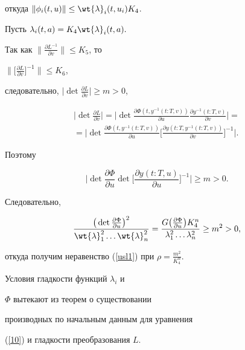 \begin{pf}
откуда $\|\phi_{i}(t,u)\|\leq \wt{\lambda}_{i}(t,u_{i})K_{4}$.


Пусть $\lambda_{i}(t,a)=K_{4}\wt{\lambda}_{i}(t,a).$


Так как $\big\|\frac{\partial L^{-1}}{\partial v}\big\|\leq K_{5}$, то


$\big\|\big [ \frac{\partial L}{\partial v} \big ]^{-1}\big\|\leq K_{6}$,


следовательно, $\big|\det \frac{\partial L}{\partial v}\big|\geq m>0$,


\begin{multline*}


\bigg|\det \frac{\partial L}{\partial v} \bigg| =


\bigg|\det\frac{\partial \Phi(t,y^{-1}(t:T,v))}


{\partial u}\frac{\partial y^{-1}(t:T,v)}{\partial v}\bigg|= \\


%


=\bigg|\det\frac{\partial \Phi(t,y^{-1}(t:T,v))}{\partial u}\bigg [


\frac{\partial y(t:T,y^{-1}(t:T,v))}{\partial v}\bigg ]^{-1}\bigg|.


\end{multline*}


Поэтому


$$


\bigg|\det\frac{\partial \Phi}{\partial u}\det


\bigg [\frac{\partial y(t:T,u)}{\partial u}\bigg


]^{-1} \bigg |\geq m>0 .


$$


Следовательно,


$$


\frac{ \big( \det \frac{\partial \Phi}{\partial u} \big)^{2}}


{\wt{\lambda}_{1}^{2}\dotsc\wt{\lambda}_{n}^{2}}=


\frac{G \big( \frac{\partial \Phi}{\partial u} \big)K_{4}^{n}}


{\lambda_{1}^{2}\dotsc\lambda_{n}^{2}}\geq m^{2}>0,


$$


откуда получим неравенство (\ref{usl1}) при $\rho=\frac{m^{2}}{K_{4}^{n}}.$


Условия гладкости функций $\lambda_{i}$ и


$\Phi$ вытекают из теорем о существовании


производных по начальным данным для уравнения


(\ref{10}) и гладкости преобразования $L$.


\end{pf}





